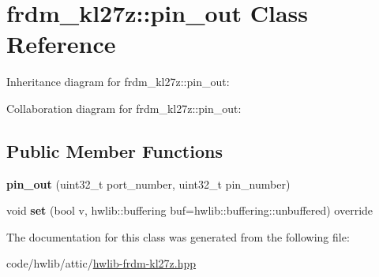 \hypertarget{classfrdm__kl27z_1_1pin__out}{}\section{frdm\+\_\+kl27z\+:\+:pin\+\_\+out Class Reference}
\label{classfrdm__kl27z_1_1pin__out}


Inheritance diagram for frdm\+\_\+kl27z\+:\+:pin\+\_\+out\+:


Collaboration diagram for frdm\+\_\+kl27z\+:\+:pin\+\_\+out\+:
\subsection*{Public Member Functions}
\begin{DoxyCompactItemize}
\item 
\mbox{\label{classfrdm__kl27z_1_1pin__out_aa6aefa327d0ca24ea918a230894eea30}} 
{\bfseries pin\+\_\+out} (uint32\+\_\+t port\+\_\+number, uint32\+\_\+t pin\+\_\+number)
\item 
\mbox{\label{classfrdm__kl27z_1_1pin__out_a2881c6f2c7d9ca46ffe9353ee4ba339d}} 
void {\bfseries set} (bool v, hwlib\+::buffering buf=hwlib\+::buffering\+::unbuffered) override
\end{DoxyCompactItemize}


The documentation for this class was generated from the following file\+:\begin{DoxyCompactItemize}
\item 
code/hwlib/attic/\hyperlink{hwlib-frdm-kl27z_8hpp}{hwlib-\/frdm-\/kl27z.\+hpp}\end{DoxyCompactItemize}
